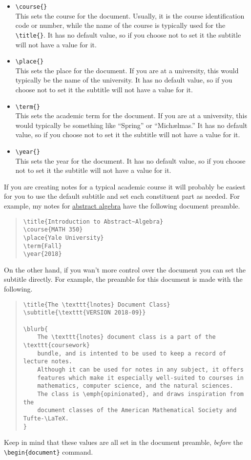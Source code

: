 \documentclass{lnotes}
\begin{document}
\begin{itemize}
\item \verb|\course{}| \\
This sets the course for the document. Usually, it is the course identification code or number, while the name of the course is typically used for the \verb|\title{}|. It has no default value, so if you choose not to set it the subtitle will not have a value for it.
\item \verb|\place{}| \\
This sets the place for the document. If you are at a university, this would typically be the name of the university. It has no default value, so if you choose not to set it the subtitle will not have a value for it.
\item \verb|\term{}| \\
This sets the academic term for the document. If you are at a university, this would typically be something like ``Spring'' or ``Michælmas.'' It has no default value, so if you choose not to set it the subtitle will not have a value for it.
\item \verb|\year{}| \\
This sets the year for the document. It has no default value, so if you choose not to set it the subtitle will not have a value for it.
\end{itemize}

If you are creating notes for a typical academic course it will probably be easiest for you to use the default subtitle and set each constituent part as needed. For example, my notes for \href{https://github.com/jopetty/lecture-notes/tree/master/MATH-350}{abstract algebra} have the following document preamble.

\begin{quote}
\begin{verbatim}
\title{Introduction to Abstract~Algebra}
\course{MATH 350}
\place{Yale University}
\term{Fall}
\year{2018}
\end{verbatim}
\end{quote}

On the other hand, if you wan't more control over the document you can set the subtitle directly. For example, the preamble for this document is made with the following.

\begin{quote}
\begin{verbatim}
\title{The \texttt{lnotes} Document Class}
\subtitle{\texttt{VERSION 2018-09}}

\blurb{
	The \texttt{lnotes} document class is a part of the \texttt{coursework}
	bundle, and is intented to be used to keep a record of lecture notes.
	Although it can be used for notes in any subject, it offers
	features which make it especially well-suited to courses in
	mathematics, computer science, and the natural sciences.
	The class is \emph{opinionated}, and draws inspiration from the
	document classes of the American Mathematical Society and Tufte-\LaTeX.
}
\end{verbatim}
\end{quote}

Keep in mind that these values are all set in the document preamble, \emph{before} the \verb|\begin{document}| command.
\end{document}
